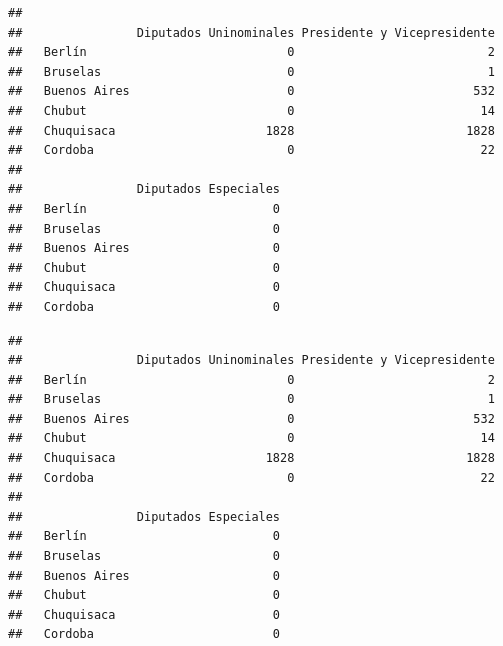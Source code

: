 \documentclass[
]{article}
\newenvironment{Shaded}{\begin{snugshade}}{\end{snugshade}}
\newcommand{\CommentTok}[1]{\textcolor[rgb]{0.56,0.35,0.01}{\textit{#1}}}
\newcommand{\KeywordTok}[1]{\textcolor[rgb]{0.13,0.29,0.53}{\textbf{#1}}}
\newcommand{\NormalTok}[1]{#1}
\newcommand{\OperatorTok}[1]{\textcolor[rgb]{0.81,0.36,0.00}{\textbf{#1}}}
\begin{document}
\begin{verbatim}
##               
##                Diputados Uninominales Presidente y Vicepresidente
##   Berlín                            0                           2
##   Bruselas                          0                           1
##   Buenos Aires                      0                         532
##   Chubut                            0                          14
##   Chuquisaca                     1828                        1828
##   Cordoba                           0                          22
##               
##                Diputados Especiales
##   Berlín                          0
##   Bruselas                        0
##   Buenos Aires                    0
##   Chubut                          0
##   Chuquisaca                      0
##   Cordoba                         0
\end{verbatim}

\begin{Shaded}
\end{Shaded}

\begin{verbatim}
##               
##                Diputados Uninominales Presidente y Vicepresidente
##   Berlín                            0                           2
##   Bruselas                          0                           1
##   Buenos Aires                      0                         532
##   Chubut                            0                          14
##   Chuquisaca                     1828                        1828
##   Cordoba                           0                          22
##               
##                Diputados Especiales
##   Berlín                          0
##   Bruselas                        0
##   Buenos Aires                    0
##   Chubut                          0
##   Chuquisaca                      0
##   Cordoba                         0
\end{verbatim}
\end{document}
